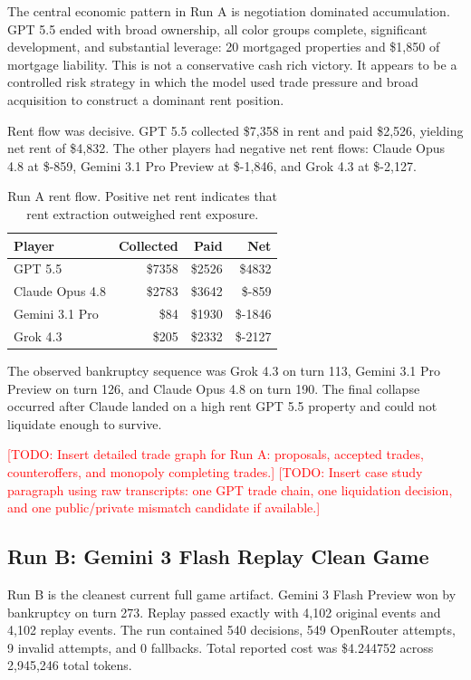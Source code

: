 \documentclass[conference]{IEEEtran}
\newcommand{\todo}[1]{\textcolor{red}{[TODO: #1]}}
\begin{document}
The central economic pattern in Run A is negotiation dominated accumulation. GPT 5.5 ended with broad ownership, all color groups complete, significant development, and substantial leverage: 20 mortgaged properties and \$1,850 of mortgage liability. This is not a conservative cash rich victory. It appears to be a controlled risk strategy in which the model used trade pressure and broad acquisition to construct a dominant rent position.

Rent flow was decisive. GPT 5.5 collected \$7,358 in rent and paid \$2,526, yielding net rent of \$4,832. The other players had negative net rent flows: Claude Opus 4.8 at \$-859, Gemini 3.1 Pro Preview at \$-1,846, and Grok 4.3 at \$-2,127.

\begin{table}[t]
\caption{Run A rent flow. Positive net rent indicates that rent extraction outweighed rent exposure.}
\label{tab:run_a_rent}
\centering
\begin{tabular}{lrrr}
\toprule
\textbf{Player} & \textbf{Collected} & \textbf{Paid} & \textbf{Net} \\
\midrule
GPT 5.5 & \$7358 & \$2526 & \$4832 \\
Claude Opus 4.8 & \$2783 & \$3642 & \$-859 \\
Gemini 3.1 Pro & \$84 & \$1930 & \$-1846 \\
Grok 4.3 & \$205 & \$2332 & \$-2127 \\
\bottomrule
\end{tabular}
\end{table}

The observed bankruptcy sequence was Grok 4.3 on turn 113, Gemini 3.1 Pro Preview on turn 126, and Claude Opus 4.8 on turn 190. The final collapse occurred after Claude landed on a high rent GPT 5.5 property and could not liquidate enough to survive.

\todo{Insert detailed trade graph for Run A: proposals, accepted trades, counteroffers, and monopoly completing trades.}
\todo{Insert case study paragraph using raw transcripts: one GPT trade chain, one liquidation decision, and one public/private mismatch candidate if available.}

\subsection{Run B: Gemini 3 Flash Replay Clean Game}

Run B is the cleanest current full game artifact. Gemini 3 Flash Preview won by bankruptcy on turn 273. Replay passed exactly with 4,102 original events and 4,102 replay events. The run contained 540 decisions, 549 OpenRouter attempts, 9 invalid attempts, and 0 fallbacks. Total reported cost was \$4.244752 across 2,945,246 total tokens.
\end{document}
